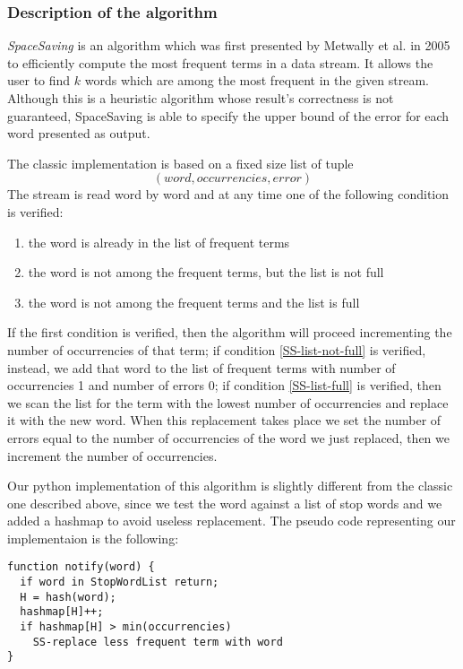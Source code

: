 \subsubsection*{Description of the algorithm}
\emph{SpaceSaving} \cite{SS} is an algorithm which was first presented by Metwally et al.
in 2005 to efficiently compute the most frequent terms in a data stream. It
allows the user to find $k$ words which are among the most frequent in the given
stream. Although this is a heuristic algorithm whose result's correctness is not
guaranteed, SpaceSaving is able to specify the upper bound of the error for each
word presented as output.

The classic implementation is based on a fixed size list of tuple 
\begin{displaymath}
	(word, occurrencies, error)
\end{displaymath}
The stream is read word by word and at any time one of the following condition
is verified:
\begin{enumerate}
	\item \label{SS-among-frequent}
		the word is already in the list of frequent terms
	\item \label{SS-list-not-full}
		the word is not among the frequent terms, but the list is not full
	\item \label{SS-list-full}
		the word is not among the frequent terms and the list is full
\end{enumerate}
If the first condition is verified, then the algorithm will proceed incrementing
the number of occurrencies of that term; if condition \ref{SS-list-not-full} is
verified, instead, we add that word to the list of frequent terms with number of
occurrencies 1 and number of errors 0; if condition \ref{SS-list-full} is
verified, then we scan the list for the term with the lowest number of
occurrencies and replace it with the new word. When this replacement takes place
we set the number of errors equal to the number of occurrencies of the word we
just replaced, then we increment the number of occurrencies.

Our python implementation of this algorithm is slightly different from the
classic one described above, since we test the word against a list of stop words
and we added a hashmap to avoid useless replacement. The pseudo code representing
our implementaion is the following:
\begin{verbatim}
function notify(word) {
  if word in StopWordList return;
  H = hash(word);
  hashmap[H]++;
  if hashmap[H] > min(occurrencies)
    SS-replace less frequent term with word
}
\end{verbatim}

